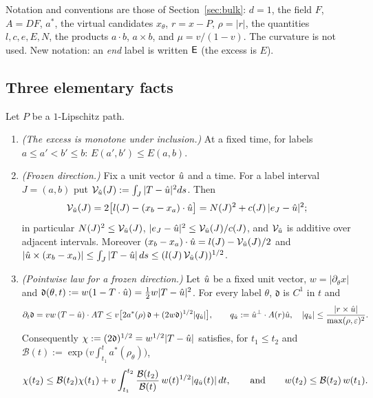 Notation and conventions are those of Section~\ref{sec:bulk}: $d=1$, the field $F$, $A=DF$, $a^*$, the virtual candidates
$x_\theta$, $r=x-P$, $\rho=|r|$, the quantities $l,c,e,E,N$, the products $a\cdot b$, $a\times b$, and $\mu=v/(1-v)$. The curvature
is not used. New notation: an \emph{end} label is written $\mathsf E$ (the excess is $E$).

\subsection{Three elementary facts}

\begin{lemma}\label{lem:E-facts}
Let $P$ be a $1$-Lipschitz path.
\begin{enumerate}
\item[(a)] \emph{(The excess is monotone under inclusion.)} At a fixed time, for labels $a\le a'<b'\le b$:
$E(a',b')\le E(a,b)$.
\item[(b)] \emph{(Frozen direction.)} Fix a unit vector $\hat u$ and a time. For a label interval $J=(a,b)$ put
$\mathcal V_{\hat u}(J):=\int_J|T-\hat u|^2ds$. Then
\[
\mathcal V_{\hat u}(J)=2\bigl[l(J)-(x_b-x_a)\cdot\hat u\bigr]=N(J)^2+c(J)\,|e_J-\hat u|^2 ;
\]
in particular $N(J)^2\le\mathcal V_{\hat u}(J)$, $|e_J-\hat u|^2\le\mathcal V_{\hat u}(J)/c(J)$, and $\mathcal V_{\hat u}$ is additive over adjacent intervals.
Moreover $(x_b-x_a)\cdot\hat u=l(J)-\mathcal V_{\hat u}(J)/2$ and
$|\hat u\times(x_b-x_a)|\le\int_J|T-\hat u|\,ds\le(l(J)\,\mathcal V_{\hat u}(J))^{1/2}$.
\item[(c)] \emph{(Pointwise law for a frozen direction.)} Let $\hat u$ be a fixed unit vector, $w=|\partial_\theta x|$ and
$\mathfrak d(\theta,t):=w(1-T\cdot\hat u)=\frac12w|T-\hat u|^2$. For every label $\theta$, $\mathfrak d$ is $C^1$ in $t$ and
\[
\partial_t\mathfrak d=vw\,(T-\hat u)\cdot AT\le v\bigl[2a^*(\rho)\,\mathfrak d+(2w\mathfrak d)^{1/2}|q_{\hat u}|\bigr],\qquad
q_{\hat u}:=\hat u^\perp\cdot A(r)\hat u,\quad|q_{\hat u}|\le\frac{|r\times\hat u|}{\max(\rho,\varepsilon)^2}.
\]
Consequently $\chi:=(2\mathfrak d)^{1/2}=w^{1/2}|T-\hat u|$ satisfies, for $t_1\le t_2$ and
$\mathcal B(t):=\exp\bigl(v\int_{t_1}^ta^*(\rho_\theta)\bigr)$,
\[
\chi(t_2)\le\mathcal B(t_2)\chi(t_1)+v\int_{t_1}^{t_2}\frac{\mathcal B(t_2)}{\mathcal B(t)}\,w(t)^{1/2}|q_{\hat u}(t)|\,dt,
\qquad\text{and}\qquad w(t_2)\le\mathcal B(t_2)\,w(t_1).
\]
\end{enumerate}
\end{lemma}
